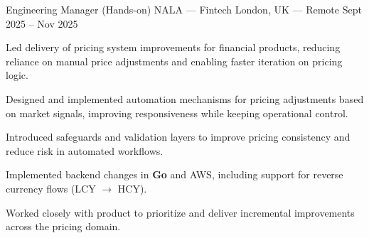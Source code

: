 \begin{cventries}
\cventry
  {Engineering Manager (Hands-on)}
  {NALA — Fintech}
  {London, UK — Remote}
  {Sept 2025 -- Nov 2025}
  {
    \begin{cvitems}
      \item {Led delivery of pricing system improvements for financial products, reducing reliance on manual price adjustments and enabling faster iteration on pricing logic.}
      \item {Designed and implemented automation mechanisms for pricing adjustments based on market signals, improving responsiveness while keeping operational control.}
      \item {Introduced safeguards and validation layers to improve pricing consistency and reduce risk in automated workflows.}
      \item {Implemented backend changes in \textbf{Go} and AWS, including support for reverse currency flows (LCY $\rightarrow$ HCY).}
      \item {Worked closely with product to prioritize and deliver incremental improvements across the pricing domain.}
    \end{cvitems}
  }


\end{cventries}
